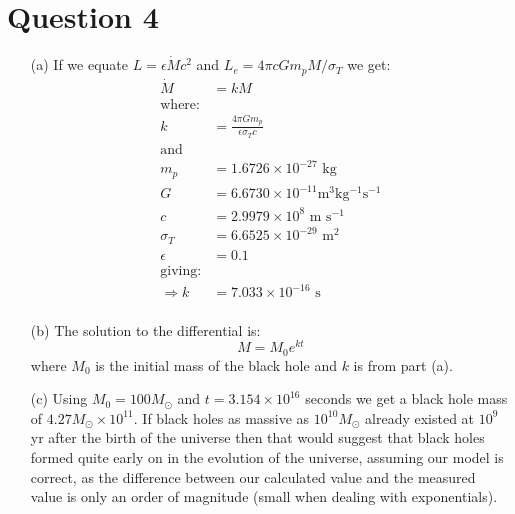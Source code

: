 \documentclass[10pt,a4paper]{article}
\begin{document}
\section*{Question 4}
\begin{itemize}
    \item[(a)] If we equate $L=\epsilon \dot M c^{2}$ and $L_{e}=4\pi c G m_{p} M / \sigma_{T}$ we get:
    \begin{align*}
        \dot M &= k M \\
        \mbox{where:}& \\
        k &= \frac{4 \pi G m_{p}}{\epsilon \sigma_{T}c} \\
        \mbox{and }& \\
        m_{p} &= 1.6726 \times 10^{-27} \mbox{ kg} \\
        G &= 6.6730 \times 10^{-11} \mbox{m$^{3}$kg$^{-1}$s$^{-1}$} \\
        c &= 2.9979 \times 10^{8} \mbox { m s$^{-1}$} \\
        \sigma_{T} &= 6.6525 \times 10^{-29} \mbox{ m$^{2}$} \\
        \epsilon &= 0.1 \\
        \mbox{giving:}& \\
        \Rightarrow k &= 7.033 \times 10^{-16} \mbox{ s} \\
    \end{align*}
    \item[(b)] The solution to the differential is:
    \begin{equation*}
        M = M_{0}e^{kt}
    \end{equation*}
    where $M_{0}$ is the initial mass of the black hole and $k$ is from part (a).
    \item[(c)] Using $M_{0} = 100 M_{\odot}$ and $t = 3.154 \times 10^{16}$ seconds we get a black hole mass of $4.27 M_{\odot} \times 10^{11}$. If black holes as massive as $10^{10}M_{\odot}$ already existed at $10^{9}$ yr after the birth of the universe then that would suggest that black holes formed quite early on in the evolution of the universe, assuming our model is correct, as the difference between our calculated value and the measured value is only an order of magnitude (small when dealing with exponentials).
\end{itemize}
\end{document}
